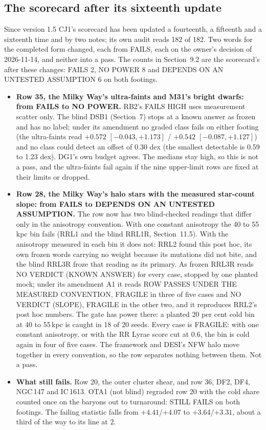 \documentclass[10pt]{article}
\begin{document}
\subsection{The scorecard after its sixteenth update}
Since version 1.5 CJ1's scorecard has been updated a fourteenth, a fifteenth and a sixteenth time and by two notes; its own audit reads 182 of 182. Two words for the completed form changed, each from FAILS, each on the owner's decision of 2026-11-14, and neither into a pass. The counts in Section~9.2 are the scorecard's after these changes: FAILS 2, NO POWER 8 and DEPENDS ON AN UNTESTED ASSUMPTION 6 on both footings.
\begin{itemize}
\item \textbf{Row 35, the Milky Way's ultra-faints and M31's bright dwarfs: from FAILS to NO POWER.} RB2's FAILS HIGH uses measurement scatter only. The blind DSB1 (Section~7) stops at a known answer as frozen and has no label; under its amendment no graded class fails on either footing (the ultra-faints read $+0.572$ $[-0.043,+1.173]$ / $+0.542$ $[-0.087,+1.127]$) and no class could detect an offset of 0.30 dex (the smallest detectable is 0.59 to 1.23 dex). DG1's own budget agrees. The medians stay high, so this is not a pass, and the ultra-faints fail again if the nine upper-limit rows are fixed at their limits or dropped.
\item \textbf{Row 28, the Milky Way's halo stars with the measured star-count slope: from FAILS to DEPENDS ON AN UNTESTED ASSUMPTION.} The row now has two blind-checked readings that differ only in the anisotropy convention. With one constant anisotropy the 40 to 55\,kpc bin fails (RRL1 and the blind RRL1R, Section~11.5). With the anisotropy measured in each bin it does not: RRL2 found this post hoc, its own frozen words carrying no weight because its mutations did not bite, and the blind RRL3R froze that reading as its primary. As frozen RRL3R reads NO VERDICT (KNOWN ANSWER) for every case, stopped by one planted mock; under its amendment A1 it reads ROW PASSES UNDER THE MEASURED CONVENTION, FRAGILE in three of five cases and NO VERDICT (SLOPE), FRAGILE in the other two, and it reproduces RRL2's post hoc numbers. The gate has power there: a planted 20 per cent cold bin at 40 to 55\,kpc is caught in 18 of 20 seeds. Every case is FRAGILE: with one constant anisotropy, or with the RR Lyrae score cut at 0.6, the bin is cold again in four of five cases. The framework and DESI's NFW halo move together in every convention, so the row separates nothing between them. Not a pass.
\item \textbf{What still fails.} Row 20, the outer cluster shear, and row 36, DF2, DF4, NGC\,147 and IC\,1613. OTA1 (not blind) regraded row 20 with the cold share counted once on the baryons out to turnaround: STILL FAILS on both footings. The failing statistic falls from $+4.41$/$+4.07$ to $+3.64$/$+3.31$, about a third of the way to its line at 2.

\end{itemize}
\end{document}

